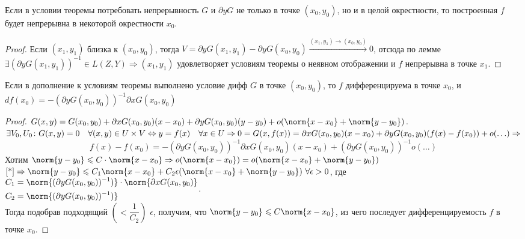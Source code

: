 \begin{theorem}
    Если в условии теоремы  потребовать непрерывность $G$ и $\partial y G$ не только в точке $(x_0, y_0)$, но и в целой окрестности, то построенная $f$ будет непрерывна в некоторой окрестности $x_0$.
\end{theorem}
\begin{proof}
    Если $(x_1, y_1)$ близка к $(x_0, y_0)$, тогда $V = \partial y G(x_1, y_1) - \partial y G(x_0, y_0) \stackrel{(x_1, y_1) \to (x_0, y_0)}{\longrightarrow} 0$, отсюда по лемме $\exists (\partial y G(x_1, y_1))^{-1} \in L(Z, Y) \Rightarrow (x_1, y_1)$ удовлетворяет условиям теоремы о неявном отображении и $f$ непрерывна в точке $x_1$.
\end{proof}

\begin{theorem}
    Если в дополнение к условиям теоремы  выполнено условие дифф $G$ в точке $(x_0, y_0)$, то $f$ дифференцируема в точке $x_0$, и $d f(x_0) = - (\partial y G(x_0, y_0))^{-1} \partial x G(x_0, y_0)$
\end{theorem}
\begin{proof}
    $G(x,y) = G(x_0, y_0) + \partial x G(x_0, y_0) (x - x_0) + \partial y G(x_0, y_0) (y - y_0) + o (\norm{x - x_0} + \norm{y - y_0})$.\\
    $\exists V_0, U_0 \colon G(x, y) = 0 \quad \forall (x, y) \in U \times V \Leftrightarrow y = f(x) \quad \forall x \in U \Rightarrow \\ 0 = G(x, f(x)) = \partial x G(x_0, y_0) (x - x_0) + \partial y G(x_0, y_0) (f(x) - f(x_0)) + o(\ldots) \Rightarrow$
    \begin{equation}
        \label{*}
        f(x) - f(x_0) = - (\partial y G(x_0, y_0))^{-1} \partial x G(x_0, y_0) (x - x_0) + (\partial y G(x_0, y_0))^{-1}o(\ldots)
    \end{equation}
    Хотим $\norm{y - y_0} \leqslant C \cdot \norm{x - x_0} \Rightarrow o(\norm{x - x_0}) = o(\norm{x - x_0} + \norm{y - y_0})$\\
    $\ref{*} \Rightarrow \norm{y - y_0} \leqslant C_1 \norm{x - x_0} + C_2\epsilon (\norm{x - x_0} + \norm{y - y_0}) \ \forall \epsilon > 0$, где\\
    $\begin{aligned}
    C_1 &= \norm{(\partial y G(x_0, y_0))^{-1})} \cdot \norm{\partial x G(x_0, y_0)} \\
    C_2 &= \norm{(\partial y G(x_0, y_0))^{-1})}
    \end{aligned}$.\\
    Тогда подобрав подходящий $\left(< \dfrac{1}{C_2}\right)$ $\epsilon$, получим, что $\norm{y - y_0} \leqslant C \norm{x - x_0}$, из чего последует дифференцируемость $f$ в точке $x_0$.
\end{proof}

